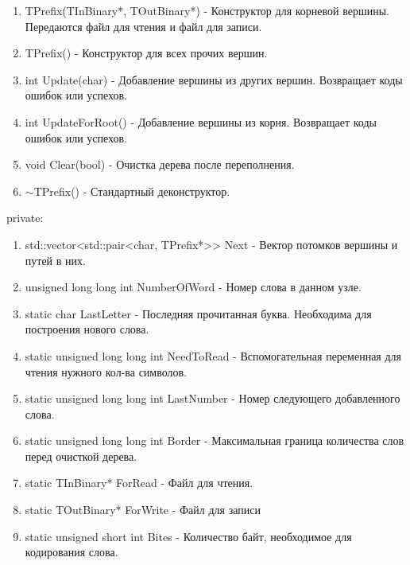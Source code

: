 \documentclass[12pt]{article}
\begin{document}
	\begin{enumerate}
		\item TPrefix(TInBinary*, TOutBinary*) - Конструктор для корневой вершины. Передаются файл для чтения и файл для записи.
		\item TPrefix() - Конструктор для всех прочих вершин.
		\item int Update(char) - Добавление вершины из других вершин. Возвращает коды ошибок или успехов.
		\item int UpdateForRoot() - Добавление вершины из корня. Возвращает коды ошибок или успехов.
		\item void Clear(bool) - Очистка дерева после переполнения.
		\item $\sim$TPrefix() - Стандартный деконструктор.
	\end{enumerate}
	\noindent
	private:
	
	\begin{enumerate}
		\item std::vector<std::pair<char, TPrefix*>\hspace{0pt}> Next - Вектор потомков вершины и путей в них.
		\item unsigned long long int NumberOfWord - Номер слова в данном узле.
		\item static char LastLetter - Последняя прочитанная буква. Необходима для построения нового слова.
		\item static unsigned long long int NeedToRead - Вспомогательная переменная для чтения нужного кол-ва символов.
		\item static unsigned long long int LastNumber - Номер следующего добавленного слова.
		\item static unsigned long long int Border - Максимальная граница количества слов перед очисткой дерева.
		\item static TInBinary* ForRead - Файл для чтения.
		\item static TOutBinary* ForWrite - Файл для записи
		\item static unsigned short int Bites - Количество байт, необходимое для кодирования слова.
	\end{enumerate}
	
\end{document}

